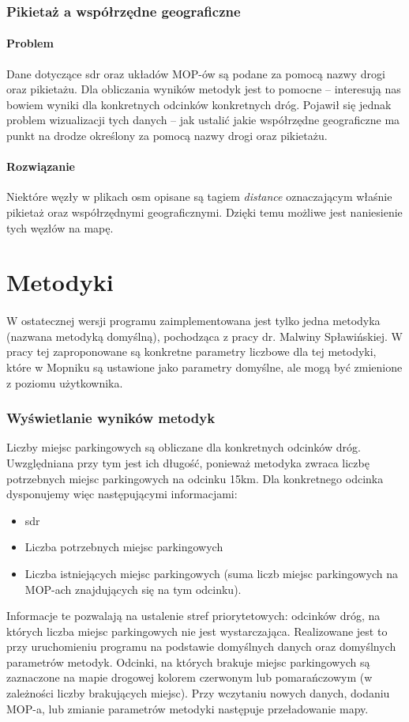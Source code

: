\subsubsection{Pikietaż a współrzędne geograficzne}
\paragraph{Problem} Dane dotyczące \acrshort{sdr} oraz układów MOP-ów są podane
za pomocą nazwy drogi oraz pikietażu. Dla obliczania wyników metodyk jest to
pomocne -- interesują nas bowiem wyniki dla konkretnych odcinków konkretnych
dróg. Pojawił się jednak problem wizualizacji tych danych -- jak ustalić jakie
współrzędne geograficzne ma punkt na drodze określony za pomocą nazwy drogi
oraz pikietażu.
\paragraph{Rozwiązanie} Niektóre węzły w plikach \acrshort{osm} opisane są tagiem
\textit{distance} oznaczającym
właśnie pikietaż oraz współrzędnymi geograficznymi. Dzięki temu możliwe jest
naniesienie tych węzłów na mapę. 

\section{Metodyki}
\paragraph{}
W ostatecznej wersji programu zaimplementowana jest tylko jedna metodyka
(nazwana metodyką domyślną),
pochodząca z pracy dr. Malwiny Spławińskiej\cite{metodyki}.
W pracy tej zaproponowane są konkretne parametry liczbowe dla tej metodyki,
które w Mopniku są ustawione jako parametry domyślne, ale mogą być zmienione
z poziomu użytkownika.
\subsubsection{Wyświetlanie wyników metodyk}
Liczby miejsc parkingowych są obliczane dla konkretnych odcinków dróg.
Uwzględniana przy tym jest ich długość, ponieważ metodyka zwraca liczbę
potrzebnych miejsc parkingowych na odcinku 15km. Dla konkretnego odcinka
dysponujemy więc następującymi informacjami: 
\begin{itemize}
  \item \acrshort{sdr}
  \item Liczba potrzebnych miejsc parkingowych
  \item Liczba istniejących miejsc parkingowych (suma liczb miejsc
    parkingowych na MOP-ach znajdujących się na tym odcinku).
\end{itemize}
Informacje te pozwalają na ustalenie stref priorytetowych: odcinków dróg, na
których liczba miejsc parkingowych nie jest wystarczająca. Realizowane jest to
przy uruchomieniu programu na podstawie domyślnych danych oraz domyślnych
parametrów metodyk. Odcinki, na których brakuje miejsc parkingowych są
zaznaczone na mapie drogowej kolorem czerwonym lub pomarańczowym (w zależności
liczby brakujących miejsc). Przy wczytaniu nowych danych,
dodaniu MOP-a, lub zmianie parametrów metodyki następuje przeładowanie mapy. 

